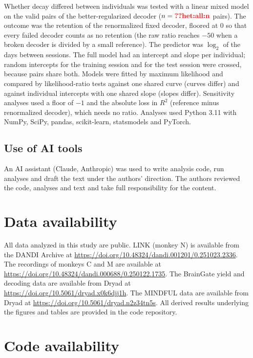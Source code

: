 \documentclass[pdflatex,sn-nature]{sn-jnl}
\begin{document}
Whether decay differed between individuals was tested with a linear mixed model on the valid pairs of the
better-regularized decoder ($n = \val{het:all:n}$ pairs). The outcome was the retention of the renormalized fixed decoder,
floored at 0 so that every failed decoder counts as no retention (the raw ratio reaches $-50$ when a broken decoder is
divided by a small reference). The predictor was $\log_2$ of the days between sessions. The full model had an intercept
and slope per individual; random intercepts for the training session and for the test session were crossed, because
pairs share both. Models were fitted by maximum likelihood and compared by likelihood-ratio tests against one shared
curve (curves differ) and against individual intercepts with one shared slope (slopes differ). Sensitivity analyses used
a floor of $-1$ and the absolute loss in $R^2$ (reference minus renormalized decoder), which needs no ratio. Analyses
used Python 3.11 with NumPy, SciPy, pandas, scikit-learn, statsmodels and PyTorch.

\subsection*{Use of AI tools}

An AI assistant (Claude, Anthropic) was used to write analysis code, run analyses and draft the text under the
authors' direction. The authors reviewed the code, analyses and text and take full responsibility for the content.

\section*{Data availability}

All data analyzed in this study are public. LINK (monkey N) is available from the DANDI Archive at
\url{https://doi.org/10.48324/dandi.001201/0.251023.2336}. The recordings of monkeys C and M are available at
\url{https://doi.org/10.48324/dandi.000688/0.250122.1735}. The BrainGate yield and decoding data are available from Dryad
at \url{https://doi.org/10.5061/dryad.x0k6djj1h}. The MINDFUL data are available from Dryad at
\url{https://doi.org/10.5061/dryad.n2z34tn5s}. All derived results underlying the figures and tables are provided in the
code repository.

\section*{Code availability}
\end{document}
